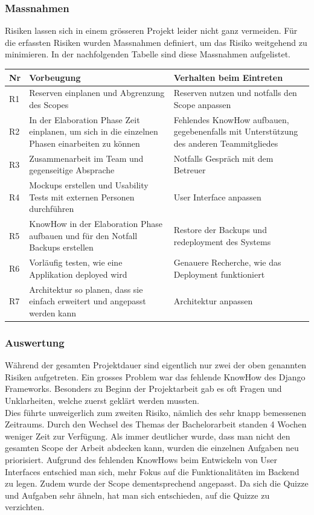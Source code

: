 \newpage

\subsubsection*{Massnahmen}
Risiken lassen sich in einem grösseren Projekt leider nicht ganz vermeiden. Für die erfassten Risiken wurden Massnahmen definiert, um das Risiko weitgehend zu minimieren. In der nachfolgenden Tabelle sind diese Massnahmen aufgelistet.

\renewcommand{\arraystretch}{1.2}
\begin{table}[H]
	\centering
	\begin{tabu} to 0.9\textwidth {l X X}
	\toprule
	Nr & Vorbeugung & Verhalten beim Eintreten \\ 
	\midrule
	R1 & Reserven einplanen und Abgrenzung des Scopes & Reserven nutzen und notfalls den Scope anpassen \\
	R2 & In der Elaboration Phase Zeit einplanen, um sich in die einzelnen Phasen einarbeiten zu können & Fehlendes KnowHow aufbauen, gegebenenfalls mit Unterstützung des anderen Teammitgliedes \\
	R3 & Zusammenarbeit im Team und gegenseitige Absprache & Notfalls Gespräch mit dem Betreuer \\
	R4 & Mockups erstellen und Usability Tests mit externen Personen durchführen & User Interface anpassen \\
	R5 & KnowHow in der Elaboration Phase aufbauen und für den Notfall Backups erstellen & Restore der Backups und redeployment des Systems \\
	R6 & Vorläufig testen, wie eine Applikation deployed wird & Genauere Recherche, wie das Deployment funktioniert \\
	R7 & Architektur so planen, dass sie einfach erweitert und angepasst werden kann & Architektur anpassen \\
	\bottomrule
	\end{tabu}
\end{table}

\subsubsection*{Auswertung}
Während der gesamten Projektdauer sind eigentlich nur zwei der oben genannten Risiken aufgetreten. Ein grosses Problem war das fehlende KnowHow des Django Frameworks. Besonders zu Beginn der Projektarbeit gab es oft Fragen und Unklarheiten, welche zuerst geklärt werden mussten. \\
Dies führte unweigerlich zum zweiten Risiko, nämlich des sehr knapp bemessenen Zeitraums. Durch den Wechsel des Themas der Bachelorarbeit standen 4 Wochen weniger Zeit zur Verfügung. Als immer deutlicher wurde, dass man nicht den gesamten Scope der Arbeit abdecken kann, wurden die einzelnen Aufgaben neu priorisiert. Aufgrund des fehlenden KnowHows beim Entwickeln von User Interfaces entschied man sich, mehr Fokus auf die Funktionalitäten im Backend zu legen. Zudem wurde der Scope dementsprechend angepasst. Da sich die Quizze und Aufgaben sehr ähneln, hat man sich entschieden, auf die Quizze zu verzichten.

